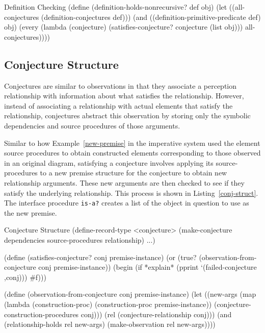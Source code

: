 \begin{code-listing}
[label=def-holds]
{Definition Checking}
(define (definition-holds-nonrecursive? def obj)
  (let ((all-conjectures (definition-conjectures def)))
    (and ((definition-primitive-predicate def) obj)
         (every (lambda (conjecture)
                  (satisfies-conjecture? conjecture (list obj)))
                all-conjectures))))
\end{code-listing}

\subsection{Conjecture Structure}

Conjectures are similar to observations in that they associate a
perception relationship with information about what satisfies the
relationship. However, instead of associating a relationship with
actual elements that satisfy the relationship, conjectures abstract
this observation by storing only the symbolic dependencies and source
procedures of those arguments.

Similar to how Example~\ref{new-premise} in the imperative system used
the element source procedures to obtain constructed elements
corresponding to those observed in an original diagram, satisfying a
conjecture involves applying its source-procedures to a new premise
structure for the conjecture to obtain new relationship
arguments. These new arguments are then checked to see if they satisfy
the underlying relationship. This process is shown in
Listing~\ref{conj-struct}. The interface procedure \texttt{is-a?}
creates a list of the object in question to use as the new premise.

\begin{code-listing}
[label=conj-struct]
{Conjecture Structure}
(define-record-type <conjecture>
  (make-conjecture dependencies source-procedures relationship) ...)

(define (satisfies-conjecture? conj premise-instance)
  (or (true? (observation-from-conjecture conj premise-instance))
      (begin (if *explain* (pprint `(failed-conjecture ,conj)))
             #f)))

(define (observation-from-conjecture conj premise-instance)
  (let ((new-args
         (map (lambda (construction-proc)
                (construction-proc premise-instance))
          (conjecture-construction-procedures conj)))
        (rel (conjecture-relationship conj)))
    (and (relationship-holds rel new-args)
         (make-observation rel new-args))))
\end{code-listing}

